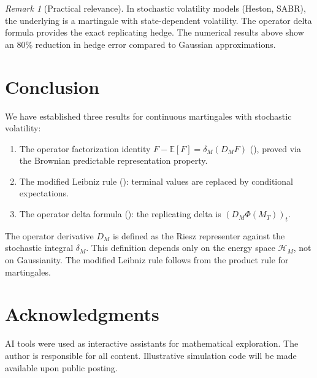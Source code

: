 \documentclass[11pt]{article}
\theoremstyle{plain}
\theoremstyle{definition}
\theoremstyle{remark}
\newtheorem{remark}{Remark}[section]
\newcommand{\E}{\mathbb{E}}
\newcommand{\HH}{\mathcal{H}}
\begin{document}
\begin{remark}[Practical relevance]
In stochastic volatility models (Heston, SABR), the underlying is a martingale 
with state-dependent volatility. The operator delta formula provides the exact 
replicating hedge. The numerical results above show an 80\% reduction in hedge 
error compared to Gaussian approximations.
\end{remark}

\section{Conclusion}\label{sec:conclusion}

We have established three results for continuous martingales with stochastic 
volatility:

\begin{enumerate}
\item The operator factorization identity $F - \E[F] = \delta_M(D_M F)$ 
(), proved via the Brownian predictable representation 
property.

\item The modified Leibniz rule (): terminal values 
are replaced by conditional expectations.

\item The operator delta formula (): the replicating 
delta is $(D_M \Phi(M_T))_t$.
\end{enumerate}

The operator derivative $D_M$ is defined as the Riesz representer against the 
stochastic integral $\delta_M$. This definition depends only on the energy space 
$\HH_M$, not on Gaussianity. The modified Leibniz rule follows from the product 
rule for martingales.

\section*{Acknowledgments}

AI tools were used as 
interactive assistants for mathematical exploration. The author is responsible 
for all content. Illustrative simulation code will be made available upon 
public posting.
\end{document}
